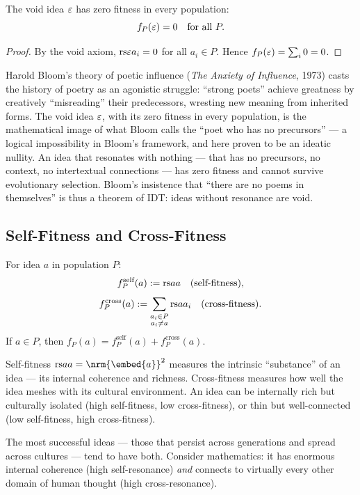 \begin{theorem}
\label{thm:void-zero-fitness}
The void idea $\varepsilon$ has zero fitness in every population:
\[
  f_P(\varepsilon) = 0 \quad \text{for all } P.
\]
\end{theorem}

\begin{proof}
By the void axiom, $\mathrm{rs}{\varepsilon}{a_i} = 0$ for all $a_i \in P$.  Hence
$f_P(\varepsilon) = \sum_{i} 0 = 0$.
\end{proof}

\begin{remark}
\label{interp:ch17:bloom_anxiety}
Harold Bloom's theory of poetic influence (\textit{The Anxiety of Influence},
1973) casts the history of poetry as an agonistic struggle: ``strong poets''
achieve greatness by creatively ``misreading'' their predecessors, wresting
new meaning from inherited forms.  The void idea $\varepsilon$, with its zero
fitness in every population, is the mathematical image of what Bloom calls
the ``poet who has no precursors'' --- a logical impossibility in Bloom's
framework, and here proven to be an ideatic nullity.  An idea that resonates
with nothing --- that has no precursors, no context, no intertextual
connections --- has zero fitness and cannot survive evolutionary selection.
Bloom's insistence that ``there are no poems in themselves'' is thus a
theorem of IDT: ideas without resonance are void.
\end{remark}

\subsection{Self-Fitness and Cross-Fitness}

\begin{definition}
\label{def:self-cross-fitness}
For idea $a$ in population $P$:
\[
  f_P^{\text{self}}(a) := \mathrm{rs}{a}{a} \quad \text{(self-fitness)},
\]
\[
  f_P^{\text{cross}}(a) := \sum_{\substack{a_i \in P \\ a_i \neq a}} \mathrm{rs}{a}{a_i}
  \quad \text{(cross-fitness)}.
\]
If $a \in P$, then $f_P(a) = f_P^{\text{self}}(a) + f_P^{\text{cross}}(a)$.
\end{definition}

\begin{interpretation}
Self-fitness $\rs{a}{a} = \nrm{\embed{a}}^2$ measures the intrinsic
``substance'' of an idea --- its internal coherence and richness.  Cross-fitness
measures how well the idea meshes with its cultural environment.  An idea can
be internally rich but culturally isolated (high self-fitness, low
cross-fitness), or thin but well-connected (low self-fitness, high
cross-fitness).

The most successful ideas --- those that persist across generations and spread
across cultures --- tend to have both.  Consider mathematics: it has enormous
internal coherence (high self-resonance) \emph{and} connects to virtually every
other domain of human thought (high cross-resonance).
\end{interpretation}

